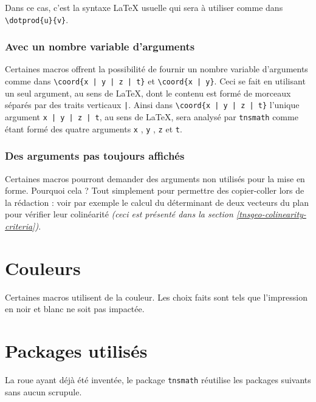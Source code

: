 \documentclass[12pt,a4paper]{book}
\newcommand\env[1]{\texttt{#1}}
\newcommand\macro[1]{\env{\textbackslash{}#1}}
\theoremstyle{definition}
\begin{document}
{{Dans ce cas, c'est la syntaxe \LaTeX{} usuelle qui sera à utiliser comme dans \macro{dotprod\{u\}\{v\}}.




\subsubsection{Avec un nombre variable d'arguments}

Certaines macros offrent la possibilité de fournir un nombre variable d'arguments comme dans \macro{coord\{x | y | z | t\}} et \macro{coord\{x | y\}}.
Ceci se fait en utilisant un seul argument, au sens de \LaTeX{}, dont le contenu est formé de morceaux séparés par des traits verticaux \verb+|+.
Ainsi dans \macro{coord\{x | y | z | t\}} l'unique argument \verb+x | y | z | t+, au sens de \LaTeX{}, sera analysé par \verb+tnsmath+ comme étant formé des quatre arguments \verb+x+ , \verb+y+ , \verb+z+ et \verb+t+.




\subsubsection{Des arguments pas toujours affichés}

Certaines macros pourront demander des arguments non utilisés pour la mise en forme. Pourquoi cela ? Tout simplement pour permettre des copier-coller lors de la rédaction : voir par exemple le calcul du déterminant de deux vecteurs du plan pour vérifier leur colinéarité \emph{(ceci est présenté dans la section \ref{tnsgeo-colinearity-criteria})}.
\section{Couleurs}

Certaines macros utilisent de la couleur. Les choix faits sont tels que l'impression en noir et blanc ne soit pas impactée.
\section{Packages utilisés}

La roue ayant déjà été inventée, le package \verb#tnsmath# réutilise les packages suivants sans aucun scrupule.

}}
\end{document}
